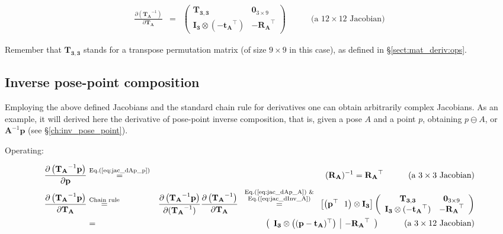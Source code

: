 \documentclass[a4paper,11pt]{report}
\begin{document}
\begin{eqnarray}
\label{eq:jac_dInv_A}
\frac{\partial \left( \mathbf{T_A} ^{-1} \right) }{\partial \mathbf{T_A} } &=& 
\left(
\begin{array}{cc}
 \mathbf{T_{3,3}} & \mathbf{0}_{3 \times 9} \\
 \mathbf{I_3} \otimes (-\mathbf{t_A}^\top) & - \mathbf{R_A}^\top
\end{array}
\right)
\quad \quad \quad
\text{(a $12 \times 12$ Jacobian)}
\end{eqnarray}

Remember that $\mathbf{T_{3,3}}$ stands for a transpose permutation matrix (of size $9 \times 9$ in this case), 
as defined in \S\ref{sect:mat_deriv:ops}.


\subsection{Inverse pose-point composition}

Employing the above defined Jacobians and the standard chain rule for derivatives one can 
obtain arbitrarily complex Jacobians. As an example, it will derived here
the derivative of pose-point inverse composition, that is, 
given a pose $A$ and a point $p$, obtaining $p \ominus A$, or $\mathbf{A}^{-1} \mathbf{p}$ 
(see \S\ref{ch:inv_pose_point}).

Operating:

\begin{eqnarray}
\label{eq:jac_dp_min_p}
\frac{\partial \left( \mathbf{T_A} ^{-1} \mathbf{p} \right) }{\partial \mathbf{p} } 
&\overset{\text{Eq.(\ref{eq:jac_dAp_p})}}{=}&
(\mathbf{R_A})^{-1}
=\mathbf{R_A}^\top
\quad \quad \quad
\text{(a $3 \times 3$ Jacobian)}
\\
\frac{\partial \left( \mathbf{T_A} ^{-1} \mathbf{p} \right) }{\partial \mathbf{T_A} } 
& \overset{\text{Chain rule}}{=}&
\frac{\partial \left( \mathbf{T_A} ^{-1} \mathbf{p} \right) }{\partial (\mathbf{T_A}^{-1}) } 
\frac{\partial \left( \mathbf{T_A} ^{-1} \right) }{\partial \mathbf{T_A} } 
\overset{ \scriptsize{ \begin{array}{c} \text{Eq.(\ref{eq:jac_dAp_A}) \&} \\  \text{Eq.(\ref{eq:jac_dInv_A})} \end{array} } }
{=}
\left[
\left( \mathbf{p}^\top ~~ 1 \right) \otimes \mathbf{I_3} 
\right]
\left(
\begin{array}{cc}
 \mathbf{T_{3,3}} & \mathbf{0}_{3 \times 9} \\
 \mathbf{I_3} \otimes (-\mathbf{t_A}^\top) & - \mathbf{R_A}^\top
\end{array}
\right)
\\
&=& 
\label{eq:jac_dp_min_A}
\left(
\begin{array}{c|c}
 \mathbf{I_3} \otimes \left( (\mathbf{p}-\mathbf{t_A})^\top \right)
 &
 -\mathbf{R_A}^\top
\end{array}
\right)
\quad \quad \quad
\text{(a $3 \times 12$ Jacobian)}
\end{eqnarray}
\end{document}
